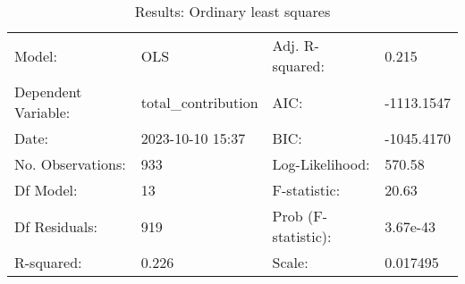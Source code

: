 \begin{table}
\caption{Results: Ordinary least squares}
\label{}
\begin{center}
\begin{tabular}{llll}
\hline
Model:              & OLS                 & Adj. R-squared:     & 0.215       \\
Dependent Variable: & total\_contribution & AIC:                & -1113.1547  \\
Date:               & 2023-10-10 15:37    & BIC:                & -1045.4170  \\
No. Observations:   & 933                 & Log-Likelihood:     & 570.58      \\
Df Model:           & 13                  & F-statistic:        & 20.63       \\
Df Residuals:       & 919                 & Prob (F-statistic): & 3.67e-43    \\
R-squared:          & 0.226               & Scale:              & 0.017495    \\
\hline
\end{tabular}
\end{center}


\end{table}
